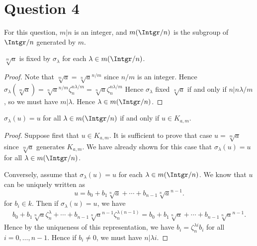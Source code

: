 \documentclass{unswmaths}
\begin{document}
\section*{Question 4}
For this question, $m|n$ is an integer, and $m(\Intgr/n)$ is the subgroup of $\Intgr/n$
generated by $m$.
\begin{lemma}
    $\sqrt[m]{a}$ is fixed by $\sigma_\lambda$ for each $\lambda \in m(\Intgr/n)$.
\end{lemma}
\begin{proof}
    Note that $\sqrt[m]{a} = \sqrt[n]{a}^{n/m}$ since $n/m$ is an integer. 
    Hence $\sigma_\lambda(\sqrt[m]{a}) = \sqrt[n]{a}^{n/m}\zeta_n^{n\lambda/m} = \sqrt[n]{a}\zeta_n^{n\lambda/m}$
    Hence $\sigma_\lambda$ fixed $\sqrt[n]{a}$ if and only if $n| n\lambda/m$, so we must have $m|\lambda$.
    Hence $\lambda \in m(\Intgr/n)$.
\end{proof}

\begin{theorem}
    $\sigma_\lambda(u) = u$ for all $\lambda \in m(\Intgr/n)$ if and only if $u \in K_{a,m}$.
\end{theorem}
\begin{proof}
    Suppose first that $u \in K_{a,m}$. It is sufficient to prove that case $u = \sqrt[m]{a}$
    since $\sqrt[m]{a}$ generates $K_{a,m}$. We have already shown for this case that $\sigma_\lambda(u) = u$
    for all $\lambda \in m(\Intgr/n)$.
    
    Conversely, assume that $\sigma_\lambda(u) = u$ for each $\lambda \in m(\Intgr/n)$. We
    know that $u$ can be uniquely written as
    \begin{equation*}
        u = b_0+b_1\sqrt[n]{a}+\cdots+b_{n-1}\sqrt[n]{a}^{n-1}.
    \end{equation*}
    for $b_i\in k$. Then if $\sigma_\lambda(u) = u$, we have
    \begin{align*}
        b_0+ b_1\sqrt[n]{a}\zeta_n^\lambda+\cdots+b_{n-1}\sqrt[n]{a}^{n-1}\zeta_n^{\lambda(n-1)} = b_0+b_1\sqrt[n]{a}+\cdots+b_{n-1}\sqrt[n]{a}^{n-1}.
    \end{align*}
    Hence by the uniqueness of this representation, we have $b_i = \zeta_n^{\lambda i}b_i$ for all $i = 0,\ldots,n-1$.
    Hence if $b_i \neq 0$, we must have $n|\lambda i$. 
    
\end{proof}
        
\end{document}
